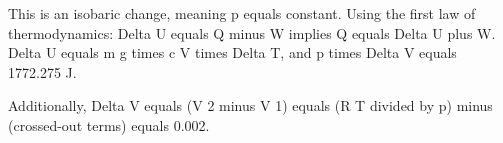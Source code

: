 This is an isobaric change, meaning p equals constant.  
Using the first law of thermodynamics:  
Delta U equals Q minus W implies Q equals Delta U plus W.  
Delta U equals m g times c V times Delta T, and p times Delta V equals 1772.275 J.  

Additionally, Delta V equals (V 2 minus V 1) equals (R T divided by p) minus (crossed-out terms) equals 0.002.